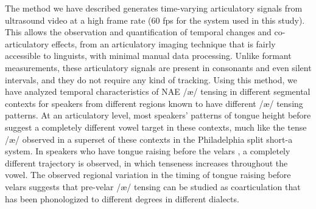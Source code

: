 \documentclass[output=paper]{LSP/langsci}
\begin{document}
The method we have described generates time-varying articulatory signals from ultrasound video at a high frame rate (60 fps for the system used in this study). This allows the observation and quantification of temporal changes and co-articulatory effects, from an articulatory imaging technique that is fairly accessible to linguists, with minimal manual data processing.  Unlike formant measurements, these articulatory signals are present in consonants and even silent intervals, and they do not require any kind of tracking.  Using this method, we have analyzed temporal characteristics of NAE /æ/ tensing in different segmental contexts for speakers from different regions known to have different /æ/ tensing patterns. At an articulatory level, most speakers' patterns of tongue height before  suggest a completely different vowel target in these contexts, much like the tense /æ/ observed in a superset of these contexts in the Philadelphia split short-a system.  In speakers who have tongue raising before the velars {}, a completely different trajectory is observed, in which tenseness increases throughout the vowel.  The observed regional variation in the timing of tongue raising before velars suggests that pre-velar /æ/ tensing can be studied as coarticulation that has been phonologized to different degrees in different dialects.
\printbibliography[heading=subbibliography,notkeyword=this]
\end{document}
